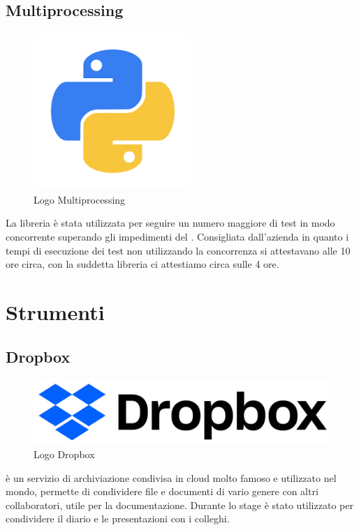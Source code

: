 \subsection{Multiprocessing}
\begin{figure}[H]
	\begin{center} \includegraphics[scale=0.5]{figures/python}
		\caption[Logo Multiprocessing]{Logo Multiprocessing}  
	\end{center}
\end{figure}
La libreria  è stata utilizzata per seguire un numero maggiore di test in modo concorrente superando gli impedimenti del . Consigliata dall'azienda in quanto i tempi di esecuzione dei test non utilizzando la concorrenza si attestavano alle 10 ore circa, con la suddetta libreria ci attestiamo circa sulle 4 ore.

\section{Strumenti}
\subsection{Dropbox}
\begin{figure}[H]
	\begin{center} \includegraphics[scale=0.2]{figures/dropbox_2017_logo}
		\caption[Logo Dropbox]{Logo Dropbox}  
	\end{center}
\end{figure}
 è un servizio di archiviazione condivisa in cloud molto famoso e utilizzato nel mondo, permette di condividere file e documenti di vario genere con altri collaboratori, utile per la documentazione. Durante lo stage è stato utilizzato per condividere il diario e le presentazioni con i colleghi.

